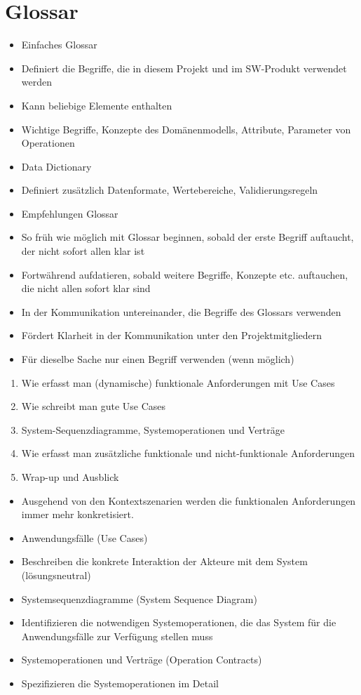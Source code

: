 \documentclass[10pt]{article}
\begin{document}
\section*{Glossar}
\begin{itemize}
  \item Einfaches Glossar
  \item Definiert die Begriffe, die in diesem Projekt und im SW-Produkt verwendet werden
  \item Kann beliebige Elemente enthalten
  \item Wichtige Begriffe, Konzepte des Domänenmodells, Attribute, Parameter von Operationen
  \item Data Dictionary
  \item Definiert zusätzlich Datenformate, Wertebereiche, Validierungsregeln
  \item Empfehlungen Glossar
  \item So früh wie möglich mit Glossar beginnen, sobald der erste Begriff auftaucht, der nicht sofort allen klar ist
  \item Fortwährend aufdatieren, sobald weitere Begriffe, Konzepte etc. auftauchen, die nicht allen sofort klar sind
  \item In der Kommunikation untereinander, die Begriffe des Glossars verwenden
  \item Fördert Klarheit in der Kommunikation unter den Projektmitgliedern
  \item Für dieselbe Sache nur einen Begriff verwenden (wenn möglich)
\end{itemize}

\begin{enumerate}
  \item Wie erfasst man (dynamische) funktionale Anforderungen mit Use Cases
  \item Wie schreibt man gute Use Cases
  \item System-Sequenzdiagramme, Systemoperationen und Verträge
  \item Wie erfasst man zusätzliche funktionale und nicht-funktionale Anforderungen
  \item Wrap-up und Ausblick
\end{enumerate}

\begin{itemize}
  \item Ausgehend von den Kontextszenarien werden die funktionalen Anforderungen immer mehr konkretisiert.
  \item Anwendungsfälle (Use Cases)
  \item Beschreiben die konkrete Interaktion der Akteure mit dem System (lösungsneutral)
  \item Systemsequenzdiagramme (System Sequence Diagram)
  \item Identifizieren die notwendigen Systemoperationen, die das System für die Anwendungsfälle zur Verfügung stellen muss
  \item Systemoperationen und Verträge (Operation Contracts)
  \item Spezifizieren die Systemoperationen im Detail
\end{itemize}
\end{document}
